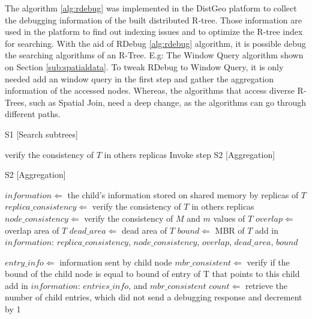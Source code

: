 The algorithm \ref{alg:rdebug} was implemented in the DistGeo platform to collect the debugging information of the built distributed R-tree. 
Those information are used in the platform to find out indexing issues and to optimize the R-tree index for searching. With the aid of RDebug \ref{alg:rdebug} algorithm, it is possible debug the searching algorithms of an R-Tree. 
E.g: The Window Query algorithm shown on Section \ref{sub:spatialdata}. To tweak RDebug to Window Query, it is only needed add an window query in the first step and gather the aggregation information of the accessed nodes. 
Whereas, the algorithms that access diverse R-Trees, such as Spatial Join, need a deep change, as the algorithms can go through different paths.
		
\medskip
\begin{center}
\begin{minipage}{1\textwidth}
\begin{algorithm2e}[H]
\SetAlFnt{\small\sf}
 \DontPrintSemicolon
 \LinesNumbered
\SetAlgoLined
 \BlankLine
 \BlankLine
	
 S1 [Search subtrees]

{
  verify the consistency of $T$ in others replicas\;
	Invoke step S2 [Aggregation]\;
}

S2 [Aggregation]

$information \Leftarrow$ the child's information stored on shared memory by replicas of $T$\;
$replica\_consistency \Leftarrow$ verify the consistency of $T$ in others replicas\;
$node\_consistency \Leftarrow$	verify the consistency of $M$ and $m$ values of  $T$\;
$overlap \Leftarrow$ overlap area of $T$\;
$dead\_area \Leftarrow$ dead area of $T$\;
$bound \Leftarrow$ MBR of $T$\;
add in $information$: $replica\_consistency$, $node\_consistency$, $overlap$, $dead\_area$, $bound$\;

{
	  $entry\_info \Leftarrow$ information sent by child node\;
    $mbr\_consistent \Leftarrow$ verify if the bound of the child node is equal to bound of entry of T that points to this child\;
    add in $information$: $entries\_info$, and $mbr\_consistent$\;
		$count \Leftarrow$ retrieve the number of child entries, which did not send a debugging response and decrement by 1\;
		
}
\end{algorithm2e}
\end{minipage}
\end{center}
